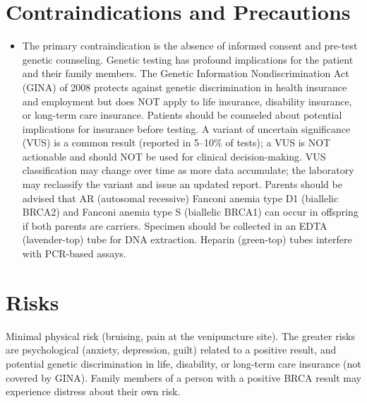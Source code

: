 \section*{Contraindications and Precautions}
\begin{itemize}
  \item The primary contraindication is the absence of informed consent and pre-test genetic counseling. Genetic testing has profound implications for the patient and their family members. The Genetic Information Nondiscrimination Act (GINA) of 2008 protects against genetic discrimination in health insurance and employment but does NOT apply to life insurance, disability insurance, or long-term care insurance. Patients should be counseled about potential implications for insurance before testing. A variant of uncertain significance (VUS) is a common result (reported in 5--10\% of tests); a VUS is NOT actionable and should NOT be used for clinical decision-making. VUS classification may change over time as more data accumulate; the laboratory may reclassify the variant and issue an updated report. Parents should be advised that AR (autosomal recessive) Fanconi anemia type D1 (biallelic BRCA2) and Fanconi anemia type S (biallelic BRCA1) can occur in offspring if both parents are carriers. Specimen should be collected in an EDTA (lavender-top) tube for DNA extraction. Heparin (green-top) tubes interfere with PCR-based assays.
\end{itemize}
\section*{Risks}
Minimal physical risk (bruising, pain at the venipuncture site). The greater risks are psychological (anxiety, depression, guilt) related to a positive result, and potential genetic discrimination in life, disability, or long-term care insurance (not covered by GINA). Family members of a person with a positive BRCA result may experience distress about their own risk.

